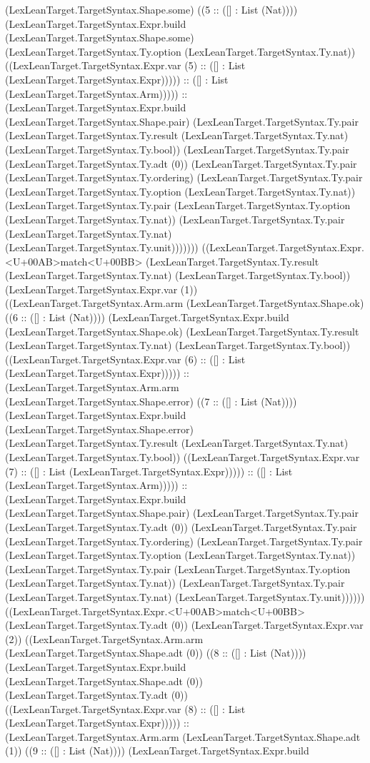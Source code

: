\documentclass[11pt]{article}
\begin{document}
(LexLeanTarget.TargetSyntax.Shape.some) ((5 :: ([] : List (Nat)))) (LexLeanTarget.TargetSyntax.Expr.build (LexLeanTarget.TargetSyntax.Shape.some) (LexLeanTarget.TargetSyntax.Ty.option (LexLeanTarget.TargetSyntax.Ty.nat)) ((LexLeanTarget.TargetSyntax.Expr.var (5) :: ([] : List (LexLeanTarget.TargetSyntax.Expr))))) :: ([] : List (LexLeanTarget.TargetSyntax.Arm))))) :: (LexLeanTarget.TargetSyntax.Expr.build (LexLeanTarget.TargetSyntax.Shape.pair) (LexLeanTarget.TargetSyntax.Ty.pair (LexLeanTarget.TargetSyntax.Ty.result (LexLeanTarget.TargetSyntax.Ty.nat) (LexLeanTarget.TargetSyntax.Ty.bool)) (LexLeanTarget.TargetSyntax.Ty.pair (LexLeanTarget.TargetSyntax.Ty.adt (0)) (LexLeanTarget.TargetSyntax.Ty.pair (LexLeanTarget.TargetSyntax.Ty.ordering) (LexLeanTarget.TargetSyntax.Ty.pair (LexLeanTarget.TargetSyntax.Ty.option (LexLeanTarget.TargetSyntax.Ty.nat)) (LexLeanTarget.TargetSyntax.Ty.pair (LexLeanTarget.TargetSyntax.Ty.option (LexLeanTarget.TargetSyntax.Ty.nat)) (LexLeanTarget.TargetSyntax.Ty.pair (LexLeanTarget.TargetSyntax.Ty.nat) (LexLeanTarget.TargetSyntax.Ty.unit))))))) ((LexLeanTarget.TargetSyntax.Expr.<U+00AB>match<U+00BB> (LexLeanTarget.TargetSyntax.Ty.result (LexLeanTarget.TargetSyntax.Ty.nat) (LexLeanTarget.TargetSyntax.Ty.bool)) (LexLeanTarget.TargetSyntax.Expr.var (1)) ((LexLeanTarget.TargetSyntax.Arm.arm (LexLeanTarget.TargetSyntax.Shape.ok) ((6 :: ([] : List (Nat)))) (LexLeanTarget.TargetSyntax.Expr.build (LexLeanTarget.TargetSyntax.Shape.ok) (LexLeanTarget.TargetSyntax.Ty.result (LexLeanTarget.TargetSyntax.Ty.nat) (LexLeanTarget.TargetSyntax.Ty.bool)) ((LexLeanTarget.TargetSyntax.Expr.var (6) :: ([] : List (LexLeanTarget.TargetSyntax.Expr))))) :: (LexLeanTarget.TargetSyntax.Arm.arm (LexLeanTarget.TargetSyntax.Shape.error) ((7 :: ([] : List (Nat)))) (LexLeanTarget.TargetSyntax.Expr.build (LexLeanTarget.TargetSyntax.Shape.error) (LexLeanTarget.TargetSyntax.Ty.result (LexLeanTarget.TargetSyntax.Ty.nat) (LexLeanTarget.TargetSyntax.Ty.bool)) ((LexLeanTarget.TargetSyntax.Expr.var (7) :: ([] : List (LexLeanTarget.TargetSyntax.Expr))))) :: ([] : List (LexLeanTarget.TargetSyntax.Arm))))) :: (LexLeanTarget.TargetSyntax.Expr.build (LexLeanTarget.TargetSyntax.Shape.pair) (LexLeanTarget.TargetSyntax.Ty.pair (LexLeanTarget.TargetSyntax.Ty.adt (0)) (LexLeanTarget.TargetSyntax.Ty.pair (LexLeanTarget.TargetSyntax.Ty.ordering) (LexLeanTarget.TargetSyntax.Ty.pair (LexLeanTarget.TargetSyntax.Ty.option (LexLeanTarget.TargetSyntax.Ty.nat)) (LexLeanTarget.TargetSyntax.Ty.pair (LexLeanTarget.TargetSyntax.Ty.option (LexLeanTarget.TargetSyntax.Ty.nat)) (LexLeanTarget.TargetSyntax.Ty.pair (LexLeanTarget.TargetSyntax.Ty.nat) (LexLeanTarget.TargetSyntax.Ty.unit)))))) ((LexLeanTarget.TargetSyntax.Expr.<U+00AB>match<U+00BB> (LexLeanTarget.TargetSyntax.Ty.adt (0)) (LexLeanTarget.TargetSyntax.Expr.var (2)) ((LexLeanTarget.TargetSyntax.Arm.arm (LexLeanTarget.TargetSyntax.Shape.adt (0)) ((8 :: ([] : List (Nat)))) (LexLeanTarget.TargetSyntax.Expr.build (LexLeanTarget.TargetSyntax.Shape.adt (0)) (LexLeanTarget.TargetSyntax.Ty.adt (0)) ((LexLeanTarget.TargetSyntax.Expr.var (8) :: ([] : List (LexLeanTarget.TargetSyntax.Expr))))) :: (LexLeanTarget.TargetSyntax.Arm.arm (LexLeanTarget.TargetSyntax.Shape.adt (1)) ((9 :: ([] : List (Nat)))) (LexLeanTarget.TargetSyntax.Expr.build 
\end{document}
